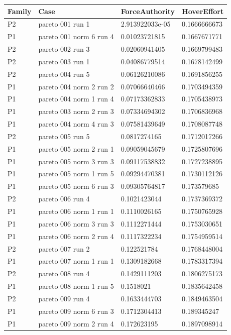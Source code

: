 \begin{tabular}{@{}llll@{}}
\toprule
Family & Case & ForceAuthority & HoverEffort \\
\midrule
P2 & pareto 001 run 1 & 2.913922033e-05 & 0.1666666673 \\
P1 & pareto 001 norm 6 run 4 & 0.01023721815 & 0.1667671771 \\
P2 & pareto 002 run 3 & 0.02060941405 & 0.1669799483 \\
P2 & pareto 003 run 1 & 0.04086779514 & 0.1678142499 \\
P2 & pareto 004 run 5 & 0.06126210086 & 0.1691856255 \\
P1 & pareto 004 norm 2 run 2 & 0.07066640466 & 0.1703494359 \\
P1 & pareto 004 norm 1 run 4 & 0.07173362833 & 0.1705438973 \\
P1 & pareto 003 norm 2 run 3 & 0.07334694302 & 0.1706836968 \\
P1 & pareto 004 norm 4 run 3 & 0.07581439649 & 0.1708087748 \\
P2 & pareto 005 run 5 & 0.0817274165 & 0.1712017266 \\
P1 & pareto 005 norm 2 run 1 & 0.09059045679 & 0.1725807696 \\
P1 & pareto 005 norm 3 run 3 & 0.09117538832 & 0.1727238895 \\
P1 & pareto 005 norm 1 run 5 & 0.09294470381 & 0.1730112126 \\
P1 & pareto 005 norm 6 run 3 & 0.09305764817 & 0.173579685 \\
P2 & pareto 006 run 4 & 0.1021423044 & 0.1737369372 \\
P1 & pareto 006 norm 1 run 1 & 0.1110026165 & 0.1750765928 \\
P1 & pareto 006 norm 3 run 3 & 0.1112271444 & 0.1753030651 \\
P1 & pareto 006 norm 2 run 4 & 0.1117322234 & 0.1754959514 \\
P2 & pareto 007 run 2 & 0.122521784 & 0.1768448004 \\
P1 & pareto 007 norm 1 run 1 & 0.1309182668 & 0.1783317394 \\
P2 & pareto 008 run 4 & 0.1429111203 & 0.1806275173 \\
P1 & pareto 008 norm 1 run 5 & 0.1518021 & 0.1835642458 \\
P2 & pareto 009 run 4 & 0.1633444703 & 0.1849463504 \\
P1 & pareto 009 norm 6 run 3 & 0.1712304413 & 0.189345247 \\
P1 & pareto 009 norm 2 run 4 & 0.172623195 & 0.1897098914 \\

\end{tabular}
